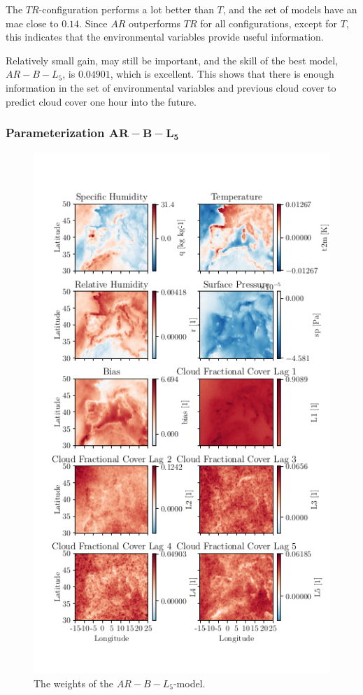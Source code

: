 The $TR$-configuration performs a lot better than $T$, and the set of models have an \acrshort{mae} close to $0.14$. Since $AR$ outperforms $TR$ for all configurations, except for $T$, this indicates that the environmental variables provide useful information. 

Relatively small gain, may still be important, and the skill of the best model, $AR-B-L_5$, is $0.04901$, which is excellent. This shows that there is enough information in the set of environmental variables and previous cloud cover to predict cloud cover one hour into the future.

\subsubsection{Parameterization $\mathbf{AR-B-L_5}$}
\begin{figure}
    \centering
    \includegraphics[scale=0.87]{python_figs/weights_AR-B-L5_best_ar_model.png}
    \caption{The weights of the $AR-B-L_5$-model.}
    \label{fig:weights_best_model}
\end{figure}
